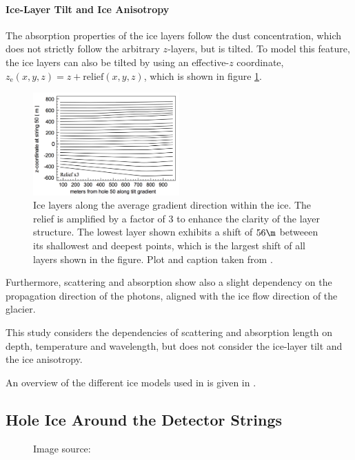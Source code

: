 \paragraph{Ice-Layer Tilt and Ice Anisotropy}
The absorption properties of the ice layers follow the dust concentration, which does not strictly follow the arbitrary $z$-layers, but is tilted. To model this feature, the ice layers can also be tilted by using an effective-$z$ coordinate, $z_\text{e}(x,y,z) = z + \text{relief}(x,y,z)$, which is shown in figure \ref{fig:wohr8uaY}. \cite{icepaper}

\begin{figure}[htbp]
  \centering
  \includegraphics[width=0.5\textwidth]{img/icepaper-fig-14-layers}
  \caption{Ice layers along the average gradient direction within the ice. The relief is amplified by a factor of 3 to enhance the clarity of the layer structure. The lowest layer shown exhibits a shift of $56\m$ betweeen its shallowest and deepest points, which is the largest shift of all layers shown in the figure. Plot and caption taken from \cite[figure 14]{icepaper}.}
  \label{fig:wohr8uaY}
\end{figure}

Furthermore, scattering and absorption show also a slight dependency on the propagation direction of the photons, aligned with the ice flow direction of the glacier. \cite{icrc17pocam}

This study considers the dependencies of scattering and absorption length on depth, temperature and wavelength, but does not consider the ice-layer tilt and the ice anisotropy.

An overview of the different ice models used in \icecube is given in \cite{flasherdataderivedicemodels}.

\subsection{Hole Ice Around the Detector Strings}
\label{sec:hole_ice}

\begin{figure}[htbp]
  \caption{Image source: \cite{icrc17pocam}}
  \label{fig:label}
\end{figure}

